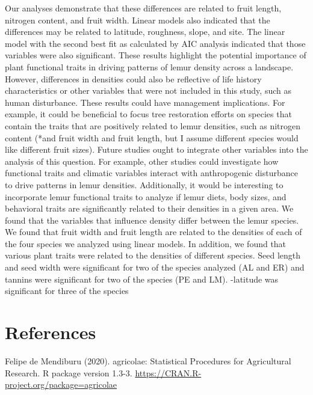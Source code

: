 \documentclass[
  12pt,
]{article}
\begin{document}
Our analyses demonstrate that these differences are related to fruit
length, nitrogen content, and fruit width. Linear models also indicated
that the differences may be related to latitude, roughness, slope, and
site. The linear model with the second best fit as calculated by AIC
analysis indicated that those variables were also significant. These
results highlight the potential importance of plant functional traits in
driving patterns of lemur density across a landscape. However,
differences in densities could also be reflective of life history
characteristics or other variables that were not included in this study,
such as human disturbance. These results could have management
implications. For example, it could be beneficial to focus tree
restoration efforts on species that contain the traits that are
positively related to lemur densities, such as nitrogen content (*and
fruit width and fruit length, but I assume different species would like
different fruit sizes). Future studies ought to integrate other
variables into the analysis of this question. For example, other studies
could investigate how functional traits and climatic variables interact
with anthropogenic disturbance to drive patterns in lemur densities.
Additionally, it would be interesting to incorporate lemur functional
traits to analyze if lemur diets, body sizes, and behavioral traits are
significantly related to their densities in a given area. We found that
the variables that influence density differ between the lemur species.
We found that fruit width and fruit length are related to the densities
of each of the four species we analyzed using linear models. In
addition, we found that various plant traits were related to the
densities of different species. Seed length and seed width were
significant for two of the species analyzed (AL and ER) and tannins were
significant for two of the species (PE and LM). -latitude was
significant for three of the species \newpage

\hypertarget{references}{%
\section{References}\label{references}}

Felipe de Mendiburu (2020). agricolae: Statistical Procedures for
Agricultural Research. R package version 1.3-3.
\url{https://CRAN.R-project.org/package=agricolae}
\end{document}
